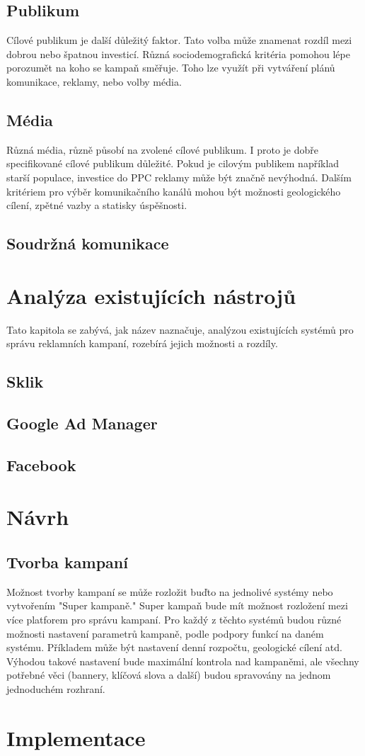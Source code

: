 \documentclass[czech,bachelor]{diploma}
\begin{document}
\section{Publikum}
Cílové publikum je další důležitý faktor. Tato volba může znamenat rozdíl mezi dobrou nebo špatnou investicí. Různá sociodemografická kritéria pomohou lépe porozumět
na koho se kampaň směřuje. Toho lze využít při vytváření plánů komunikace, reklamy, nebo volby média.

\section{Média}
Různá média, různě působí na zvolené cílové publikum. I proto je dobře specifikované cílové publikum důležité. Pokud je cilovým publikem například starší populace, investice
do PPC reklamy může být značně nevýhodná. Dalším kritériem pro výběr komunikačního kanálů mohou být možnosti geologického cílení, zpětné vazby a statisky úspěšnosti. 


\section{Soudržná komunikace}


\chapter{Analýza existujících nástrojů}
Tato kapitola se zabývá, jak název naznačuje, analýzou existujících systémů pro správu reklamních kampaní, rozebírá jejich možnosti a rozdíly. 


\section{Sklik}

\section{Google Ad Manager}

\section{Facebook}


\chapter{Návrh}

\section{Tvorba kampaní}
Možnost tvorby kampaní se může rozložit buďto na jednolivé systémy nebo vytvořením "Super kampaně." Super kampaň bude mít možnost rozložení mezi více platforem pro správu kampaní.
Pro každý z těchto systémů budou různé možnosti nastavení parametrů kampaně, podle podpory funkcí na daném systému. Příkladem může být nastavení denní rozpočtu, geologické cílení atd.
Výhodou takové nastavení bude maximální kontrola nad kampaněmi, ale všechny potřebné věci (bannery, klíčová slova a další) budou spravovány na jednom jednoduchém rozhraní.  

\chapter{Implementace}


\printbibliography[title={Literatura}, heading=bibintoc]
\end{document}
